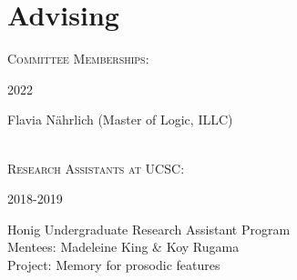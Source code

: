 \documentclass[12pt]{article} %
\begin{document}
\vspace{0.28cm}

\section{Advising}

\textsc{Committee Memberships}:\\

\begin{minipage}[t]{3cm}
	2022
\end{minipage}
\begin{minipage}[t]{\smallertextwidth}Flavia Nährlich (Master of Logic, ILLC)\end{minipage}\\



\textsc{Research Assistants at UCSC}:\\

\begin{minipage}[t]{3cm}
2018-2019
\end{minipage}
\begin{minipage}[t]{\smallertextwidth}Honig Undergraduate Research Assistant Program\\
Mentees: Madeleine King \& Koy Rugama\\
Project: Memory for prosodic features \end{minipage}






\end{document}

